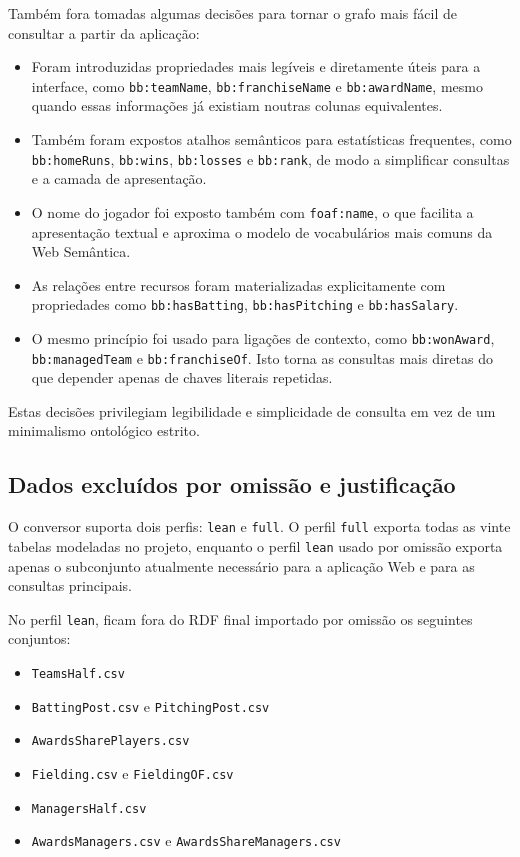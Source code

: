 Também fora tomadas algumas decis\~oes para tornar o grafo mais f\'acil de consultar a partir da aplica\c{c}\~ao:

\begin{itemize}[leftmargin=*]
  \item Foram introduzidas propriedades mais leg\'iveis e diretamente \'{u}teis para a interface, como \texttt{bb:teamName}, \texttt{bb:franchiseName} e \texttt{bb:awardName}, mesmo quando essas informa\c{c}\~oes j\'a existiam noutras colunas equivalentes.
  \item Tamb\'em foram expostos atalhos sem\^anticos para estat\'isticas frequentes, como \texttt{bb:homeRuns}, \texttt{bb:wins}, \texttt{bb:losses} e \texttt{bb:rank}, de modo a simplificar consultas e a camada de apresenta\c{c}\~ao.
  \item O nome do jogador foi exposto tamb\'em com \texttt{foaf:name}, o que facilita a apresenta\c{c}\~ao textual e aproxima o modelo de vocabul\'arios mais comuns da Web Sem\^antica.
  \item As rela\c{c}\~oes entre recursos foram materializadas explicitamente com propriedades como \texttt{bb:hasBatting}, \texttt{bb:hasPitching} e \texttt{bb:hasSalary}.
  \item O mesmo princ\'ipio foi usado para liga\c{c}\~oes de contexto, como \texttt{bb:wonAward}, \texttt{bb:managedTeam} e \texttt{bb:franchiseOf}. Isto torna as consultas mais diretas do que depender apenas de chaves literais repetidas.
\end{itemize}

Estas decis\~oes privilegiam legibilidade e simplicidade de consulta em vez de um minimalismo ontol\'ogico estrito.

\subsection{Dados exclu\'idos por omiss\~ao e justifica\c{c}\~ao}

O conversor suporta dois perfis: \texttt{lean} e \texttt{full}. O perfil \texttt{full} exporta todas as vinte tabelas modeladas no projeto, enquanto o perfil \texttt{lean} \textemdash{} usado por omiss\~ao \textemdash{} exporta apenas o subconjunto atualmente necess\'ario para a aplica\c{c}\~ao Web e para as consultas principais.

No perfil \texttt{lean}, ficam fora do RDF final importado por omiss\~ao os seguintes conjuntos:

\begin{itemize}[leftmargin=*]
  \item \texttt{TeamsHalf.csv}
  \item \texttt{BattingPost.csv} e \texttt{PitchingPost.csv}
  \item \texttt{AwardsSharePlayers.csv}
  \item \texttt{Fielding.csv} e \texttt{FieldingOF.csv}
  \item \texttt{ManagersHalf.csv}
  \item \texttt{AwardsManagers.csv} e \texttt{AwardsShareManagers.csv}
\end{itemize}

